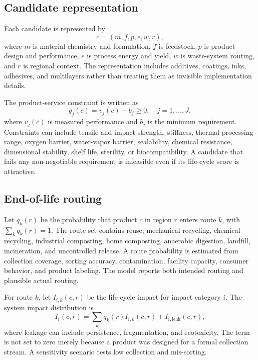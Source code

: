 \documentclass[conference]{IEEEtran}
\begin{document}
\subsection{Candidate representation}

Each candidate is represented by
\begin{equation}
 c=(m,f,p,e,w,r),
 \label{eq:candidate}
\end{equation}
where $m$ is material chemistry and formulation, $f$ is feedstock, $p$ is product design and performance, $e$ is process energy and yield, $w$ is waste-system routing, and $r$ is regional context. The representation includes additives, coatings, inks, adhesives, and multilayers rather than treating them as invisible implementation details.

The product-service constraint is written as
\begin{equation}
 g_j(c)=v_j(c)-b_j\geq 0, \quad j=1,\ldots,J,
 \label{eq:constraint}
\end{equation}
where $v_j(c)$ is measured performance and $b_j$ is the minimum requirement. Constraints can include tensile and impact strength, stiffness, thermal processing range, oxygen barrier, water-vapor barrier, sealability, chemical resistance, dimensional stability, shelf life, sterility, or biocompatibility. A candidate that fails any non-negotiable requirement is infeasible even if its life-cycle score is attractive.

\subsection{End-of-life routing}

Let $q_k(r)$ be the probability that product $c$ in region $r$ enters route $k$, with $\sum_k q_k(r)=1$. The route set contains reuse, mechanical recycling, chemical recycling, industrial composting, home composting, anaerobic digestion, landfill, incineration, and uncontrolled release. A route probability is estimated from collection coverage, sorting accuracy, contamination, facility capacity, consumer behavior, and product labeling. The model reports both intended routing and plausible actual routing.

For route $k$, let $I_{i,k}(c,r)$ be the life-cycle impact for impact category $i$. The system impact distribution is
\begin{equation}
 I_i(c,r)=\sum_k q_k(r)I_{i,k}(c,r)+I_{i,\mathrm{leak}}(c,r),
 \label{eq:routing}
\end{equation}
where leakage can include persistence, fragmentation, and ecotoxicity. The term is not set to zero merely because a product was designed for a formal collection stream. A sensitivity scenario tests low collection and mis-sorting.
\end{document}
